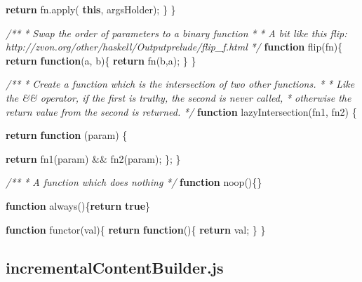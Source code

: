 \documentclass[12pt, ]{article}
\newenvironment{Shaded}{}{}
\newcommand{\KeywordTok}[1]{\textcolor[rgb]{0.00,0.44,0.13}{\textbf{{#1}}}}
\newcommand{\CommentTok}[1]{\textcolor[rgb]{0.38,0.63,0.69}{\textit{{#1}}}}
\newcommand{\OtherTok}[1]{\textcolor[rgb]{0.00,0.44,0.13}{{#1}}}
\newcommand{\FunctionTok}[1]{\textcolor[rgb]{0.02,0.16,0.49}{{#1}}}
\newcommand{\NormalTok}[1]{{#1}}
\begin{document}
\begin{Shaded}
\begin{Highlighting}[]
      \KeywordTok{return} \OtherTok{fn}\NormalTok{.}\FunctionTok{apply}\NormalTok{( }\KeywordTok{this}\NormalTok{, argsHolder);      }
   \NormalTok{\}       }
\NormalTok{\}}


\CommentTok{/**}
\CommentTok{ * Swap the order of parameters to a binary function}
\CommentTok{ * }
\CommentTok{ * A bit like this flip: http://zvon.org/other/haskell/Outputprelude/flip_f.html}
\CommentTok{ */}
\KeywordTok{function} \FunctionTok{flip}\NormalTok{(fn)\{}
   \KeywordTok{return} \KeywordTok{function}\NormalTok{(a, b)\{}
      \KeywordTok{return} \FunctionTok{fn}\NormalTok{(b,a);}
   \NormalTok{\}}
\NormalTok{\}}


\CommentTok{/**}
\CommentTok{ * Create a function which is the intersection of two other functions.}
\CommentTok{ * }
\CommentTok{ * Like the && operator, if the first is truthy, the second is never called,}
\CommentTok{ * otherwise the return value from the second is returned.}
\CommentTok{ */}
\KeywordTok{function} \FunctionTok{lazyIntersection}\NormalTok{(fn1, fn2) \{}

   \KeywordTok{return} \KeywordTok{function} \NormalTok{(param) \{}
                                                              
      \KeywordTok{return} \FunctionTok{fn1}\NormalTok{(param) && }\FunctionTok{fn2}\NormalTok{(param);}
   \NormalTok{\};   }
\NormalTok{\}}

\CommentTok{/**}
\CommentTok{ * A function which does nothing}
\CommentTok{ */}
\KeywordTok{function} \FunctionTok{noop}\NormalTok{()\{\}}

\KeywordTok{function} \FunctionTok{always}\NormalTok{()\{}\KeywordTok{return} \KeywordTok{true}\NormalTok{\}}

\KeywordTok{function} \FunctionTok{functor}\NormalTok{(val)\{}
   \KeywordTok{return} \KeywordTok{function}\NormalTok{()\{}
      \KeywordTok{return} \NormalTok{val;}
   \NormalTok{\}}
\NormalTok{\}}
\end{Highlighting}
\end{Shaded}

\pagebreak

\subsection{incrementalContentBuilder.js}\label{headerux5fincrementalContentBuilder}

\label{src_incrementalContentBuilder}
\end{document}
